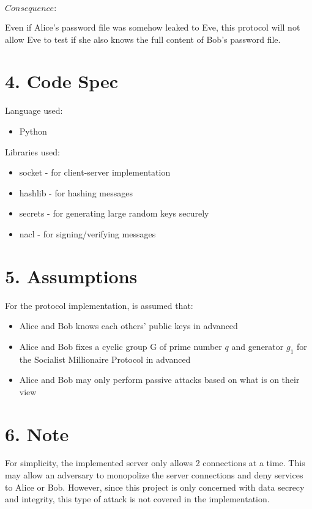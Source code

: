 \documentclass{article}
\begin{document}
$Consequence:$ 

Even if Alice's password file was somehow leaked to Eve, this protocol will not allow 
Eve to test if she also knows the full content of Bob's password file.

\section*{4. Code Spec}

Language used: 
\begin{itemize}
  \item Python
\end{itemize}

Libraries used: 
\begin{itemize}
  \item socket - for client-server implementation
  \item hashlib - for hashing messages
  \item secrets - for generating large random keys securely
  \item nacl - for signing/verifying messages
\end{itemize}

\section*{5. Assumptions}

For the protocol implementation, is assumed that:

\begin{itemize}
  \item Alice and Bob knows each others' public keys in advanced
  \item Alice and Bob fixes a cyclic group G of prime number $q$ and generator $g_1$ 
  for the Socialist Millionaire Protocol in advanced
  \item Alice and Bob may only perform passive attacks based on what is on their view
\end{itemize}

\section*{6. Note}

For simplicity, the implemented server only allows 2 connections at a time. 
This may allow an adversary to monopolize the server connections and deny 
services to Alice or Bob. However, since this project is only concerned with 
data secrecy and integrity, this type of attack is not covered in the 
implementation.
\end{document}
